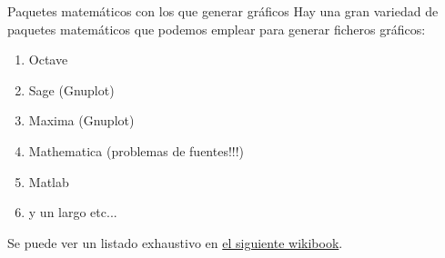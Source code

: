 \documentclass{beamer}
\begin{document}

\begin{frame}{Paquetes matem\'aticos con los que generar gr\'aficos}
Hay una gran variedad de  paquetes matem\'aticos que podemos emplear para generar ficheros 
gr\'aficos:
\begin{enumerate}
\item Octave
\item Sage  (Gnuplot)
\item Maxima (Gnuplot)
\item Mathematica {\small (problemas de fuentes!!!)}
\item Matlab
\item y un largo etc...
\end{enumerate}

Se puede ver un listado exhaustivo en \href{https://en.wikibooks.org/wiki/LaTeX/Importing_Graphics\#Third-party_graphics_tools}{el siguiente wikibook}.

\end{frame}

\end{document}
